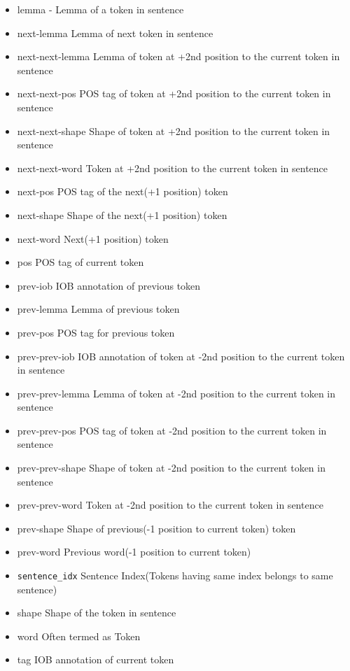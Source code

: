\documentclass{book}
\begin{document}
\begin{itemize}
	\item lemma - Lemma of a token in sentence
	\item next-lemma Lemma of next token in sentence
	\item next-next-lemma Lemma of token at +2nd position to the current token in sentence
	\item next-next-pos POS tag of token at +2nd position to the current token in sentence
	\item next-next-shape Shape of token at +2nd position to the current token in sentence
	\item next-next-word Token at +2nd position to the current token in sentence
	\item next-pos POS tag of the next(+1 position) token
	\item next-shape Shape of the next(+1 position) token
	\item next-word Next(+1 position) token
	\item pos POS tag of current token
	\item prev-iob IOB annotation of previous token
	\item prev-lemma Lemma of previous token
	\item prev-pos POS tag for previous token
	\item prev-prev-iob IOB annotation of token at -2nd position to the current token in sentence
	\item prev-prev-lemma Lemma of token at -2nd position to the current token in sentence
	\item prev-prev-pos POS tag of token at -2nd position to the current token in sentence
	\item prev-prev-shape Shape of token at -2nd position to the current token in sentence
	\item prev-prev-word Token at -2nd position to the current token in sentence
	\item prev-shape Shape of previous(-1 position to current token) token
	\item prev-word Previous word(-1 position to current token)
	\item \lstinline{sentence_idx} Sentence Index(Tokens having same index belongs to same sentence)
	\item shape Shape of the token in sentence
	\item word Often termed as Token
	\item tag IOB annotation of current token
\end{itemize}
\end{document}
